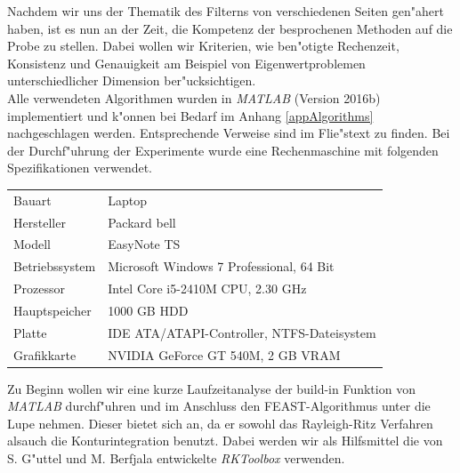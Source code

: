 Nachdem wir uns der Thematik des Filterns von verschiedenen Seiten gen"ahert haben, ist es nun an der Zeit, die Kompetenz der besprochenen Methoden auf die Probe zu stellen. Dabei wollen wir Kriterien, wie ben"otigte Rechenzeit, Konsistenz und Genauigkeit am Beispiel von Eigenwertproblemen unterschiedlicher Dimension ber"ucksichtigen.\\

Alle verwendeten Algorithmen wurden in \emph{MATLAB} (Version 2016b) implementiert und k"onnen bei Bedarf im Anhang \ref{appAlgorithms} nachgeschlagen werden. Entsprechende Verweise sind im Flie"stext zu finden.
Bei der Durchf"uhrung der Experimente wurde eine Rechenmaschine mit folgenden Spezifikationen verwendet.

\vspace{.5cm}
\begin{center}
	\begin{tabular}{ll}
	\hline
	Bauart & Laptop \\
	Hersteller & Packard bell \\
	Modell & EasyNote TS \\
	Betriebssystem & Microsoft Windows 7 Professional, 64 Bit \\
	Prozessor & Intel Core i5-2410M CPU, 2.30 GHz\\
	Hauptspeicher & 1000 GB HDD\\
	Platte & IDE ATA/ATAPI-Controller, NTFS-Dateisystem\\
	Grafikkarte & NVIDIA GeForce GT 540M, 2 GB VRAM\\
	\hline
	\end{tabular}
\end{center}

\vspace{.5cm}
Zu Beginn wollen wir eine kurze Laufzeitanalyse der build-in Funktion  von \emph{MATLAB} durchf"uhren und im Anschluss den FEAST-Algorithmus unter die Lupe nehmen. Dieser bietet sich an, da er sowohl das Rayleigh-Ritz Verfahren alsauch die Konturintegration benutzt. Dabei werden wir als Hilfsmittel die von S. G"uttel und M. Berfjala entwickelte \emph{RKToolbox} \cite{rkt} verwenden.


